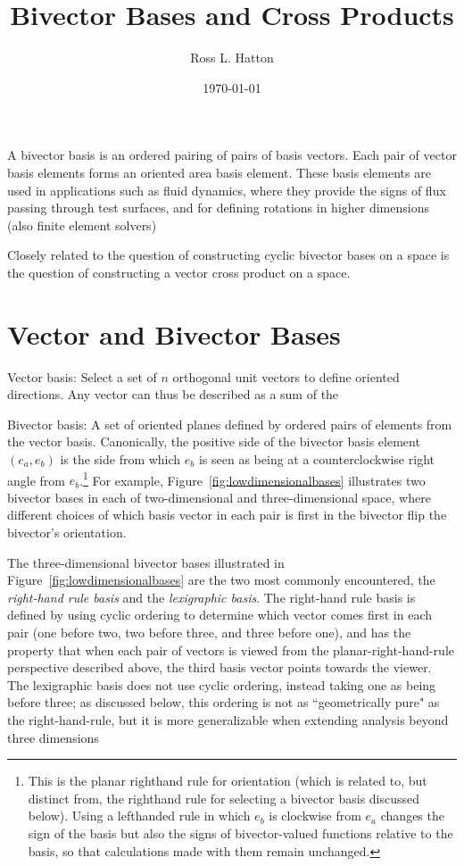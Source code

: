 \documentclass[11pt]{article}
\newcommand{\bv}[1][]{e_{#1}}
\newcommand{\bp}[2]{(#1,#2)}
\begin{document}
\title{Bivector Bases and Cross Products}
\author{Ross L. Hatton}
\date{\today}
\maketitle

A bivector basis is an ordered pairing of pairs of basis vectors. Each pair of vector basis elements forms an oriented area basis element. These basis elements are used in applications such as fluid dynamics, where they provide the signs of flux passing through test surfaces, and for defining rotations in higher dimensions (also finite element solvers)

Closely related to the question of constructing cyclic bivector bases on a space is the question of constructing a vector cross product on a space. 

\section{Vector and Bivector Bases}

Vector basis: Select a set of $n$ orthogonal unit vectors to define oriented directions. Any vector can thus be described as a sum of the 

Bivector basis: A set of oriented planes defined by ordered pairs of elements from the vector basis. Canonically, the positive side of the bivector basis element  $\bp{\bv[a]}{\bv[b]}$ is the side from which $\bv[b]$ is seen as being at a counterclockwise right angle from $\bv[b]$.\footnote{This is the planar righthand rule for orientation (which is related to, but distinct from, the righthand rule for selecting a bivector basis discussed below). Using a lefthanded rule in which $\bv[b]$ is clockwise from $\bv[a]$ changes the sign of the basis but also the signs of bivector-valued functions relative to the basis, so that calculations made with them remain unchanged.} For example, Figure~\ref{fig:lowdimensionalbases} illustrates two bivector bases in each of two-dimensional and three-dimensional space, where different choices of which basis vector in each pair is first in the bivector flip the bivector's orientation.

The three-dimensional bivector bases illustrated in Figure~\ref{fig:lowdimensionalbases} are the two most commonly encountered, the \emph{right-hand rule basis} and the \emph{lexigraphic basis}. The right-hand rule basis is defined by using cyclic ordering to determine which vector comes first in each pair (one before two, two before three, and three before one), and has the property that when each pair of vectors is viewed from the planar-right-hand-rule perspective described above, the third basis vector points towards the viewer. The lexigraphic basis does not use cyclic ordering, instead taking one as being before three; as discussed below, this ordering is not as ``geometrically pure" as the right-hand-rule, but it is more generalizable when extending analysis beyond three dimensions
\end{document}
